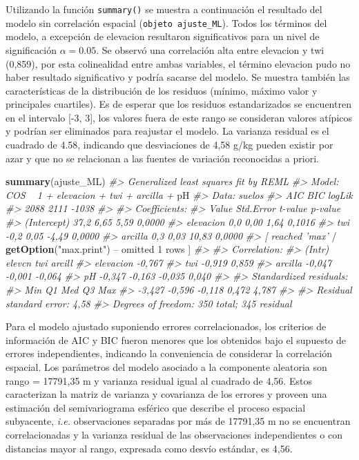 \documentclass[11pt,b5paper,]{krantz}
\newenvironment{Shaded}{}{}
\newcommand{\CommentTok}[1]{\textcolor[rgb]{0.38,0.63,0.69}{\textit{#1}}}
\newcommand{\DecValTok}[1]{\textcolor[rgb]{0.25,0.63,0.44}{#1}}
\newcommand{\KeywordTok}[1]{\textcolor[rgb]{0.00,0.44,0.13}{\textbf{#1}}}
\newcommand{\NormalTok}[1]{#1}
\newcommand{\OperatorTok}[1]{\textcolor[rgb]{0.40,0.40,0.40}{#1}}
\newcommand{\StringTok}[1]{\textcolor[rgb]{0.25,0.44,0.63}{#1}}
\begin{document}
Utilizando la función \texttt{summary()} se muestra a continuación el resultado del modelo sin correlación espacial (\texttt{objeto\ ajuste\_ML}). Todos los términos del modelo, a excepción de elevacion resultaron significativos para un nivel de significación \(\alpha=0.05\). Se observó una correlación alta entre elevacion y twi (0,859), por esta colinealidad entre ambas variables, el término elevacion pudo no haber resultado significativo y podría sacarse del modelo. Se muestra también las características de la distribución de los residuos (mínimo, máximo valor y principales cuartiles). Es de esperar que los residuos estandarizados se encuentren en el intervalo {[}-3, 3{]}, los valores fuera de este rango se consideran valores atípicos y podrían ser eliminados para reajustar el modelo. La varianza residual es el cuadrado de 4.58, indicando que desviaciones de 4,58 g/kg pueden existir por azar y que no se relacionan a las fuentes de variación reconocidas a priori.

\begin{Shaded}
\begin{Highlighting}[]
\KeywordTok{summary}\NormalTok{(ajuste_ML)}
\CommentTok{#> Generalized least squares fit by REML}
\CommentTok{#> Model: COS ~ 1 + elevacion + twi + arcilla +}
\NormalTok{pH}
\CommentTok{#> Data: suelos}
\CommentTok{#> AIC BIC logLik}
\CommentTok{#> 2088 2111 -1038}
\CommentTok{#>}
\CommentTok{#> Coefficients:}
\CommentTok{#> Value Std.Error t-value p-value}
\CommentTok{#> (Intercept) 37,2 6,65 5,59 0,0000}
\CommentTok{#> elevacion 0,0 0,00 1,64 0,1016}
\CommentTok{#> twi -0,2 0,05 -4,49 0,0000}
\CommentTok{#> arcilla 0,3 0,03 10,83 0,0000}
\CommentTok{#> [ reached 'max'}
    \OperatorTok{/}\StringTok{ }\KeywordTok{getOption}\NormalTok{(}\StringTok{"max.print"}\NormalTok{) }\OperatorTok{--}
\NormalTok{omitted }\DecValTok{1}\NormalTok{ rows ]}
\CommentTok{#>}
\CommentTok{#> Correlation:}
\CommentTok{#> (Intr) elevcn twi arcill}
\CommentTok{#> elevacion -0,767}
\CommentTok{#> twi -0,919 0,859}
\CommentTok{#> arcilla -0,047 -0,001 -0,064}
\CommentTok{#> pH -0,347 -0,163 -0,035 0,040}
\CommentTok{#>}
\CommentTok{#> Standardized residuals:}
\CommentTok{#> Min Q1 Med Q3 Max}
\CommentTok{#> -3,427 -0,596 -0,118 0,472 4,787}
\CommentTok{#>}
\CommentTok{#> Residual standard error: 4,58}
\CommentTok{#> Degrees of freedom: 350 total; 345 residual}
\end{Highlighting}
\end{Shaded}

Para el modelo ajustado suponiendo errores correlacionados, los criterios de información de AIC y BIC fueron menores que los obtenidos bajo el supuesto de errores independientes, indicando la conveniencia de considerar la correlación espacial. Los parámetros del modelo asociado a la componente aleatoria son rango = 17791,35 m y varianza residual igual al cuadrado de 4,56. Estos caracterizan la matriz de varianza y covarianza de los errores y proveen una estimación del semivariograma esférico que describe el proceso espacial subyacente, \emph{i.e.} observaciones separadas por más de 17791,35 m no se encuentran correlacionadas y la varianza residual de las observaciones independientes o con distancias mayor al rango, expresada como desvío estándar, es 4,56.
\end{document}
